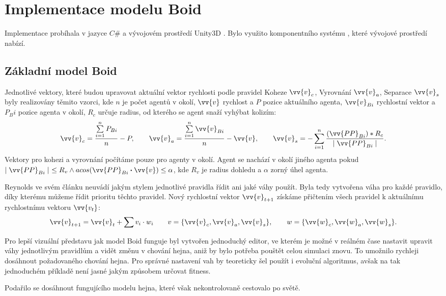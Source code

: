 \section{Implementace modelu Boid}
Implementace probíhala v jazyce $C\#$ a vývojovém prostředí Unity3D \cite{Unity}. Bylo využito komponentního systému \cite{Components}, které vývojové prostředí nabízí. 
\subsection{Základní model Boid}
Jednotlivé vektory, které budou upravovat aktuální vektor rychlosti podle pravidel Koheze $\vv{v}_c$, Vyrovnání $\vv{v}_a$, Separace $\vv{v}_s$ byly realizovány těmito vzorci, kde $n$ je počet agentů v okolí, $\vv{v}$ rychlost a $P$ pozice aktuálního agenta, $\vv{v}_{Bi}$ rychlostní vektor a $P_Bi$ pozice agenta v okolí, $R_c$ určuje radius, od kterého se agent snaží vyhýbat kolizím: 
\begin{equation*}
\vv{v}_c = \frac{ \sum\limits_{i=1}^n{P_{Bi} } }{ n } - P, \qquad
\vv{v}_a = \frac{ \sum\limits_{i=1}^n{\vv{v}_{Bi} } }{ n } - \vv{v}, \qquad
\vv{v}_s = -\sum\limits_{i=1}^n{ \frac{(\vv{PP}_{Bi}) * R_c}{\mid \vv{PP}_{Bi}\mid}}.
\end{equation*}
Vektory pro kohezi a vyrovnání počítáme pouze pro agenty v okolí. Agent se nachází v okolí jiného agenta pokud $\mid\vv{PP}_{Bi}\mid \ \leq R_v \land acos(\vv{PP}_{Bi} \boldsymbol{\cdot} \vv{v}) \leq \alpha $, kde $R_v$ je radius dohledu a $\alpha$ zorný úhel agenta. 
\par
Reynolds ve svém článku neuvádí jakým stylem jednotlivé pravidla řídit ani jaké váhy použít. Byla tedy vytvořena váha pro každé pravidlo, díky kterému můžeme řídit prioritu těchto pravidel. Nový rychlostní vektor $\vv{v}_{t+1}$ získáme přičtením všech pravidel k aktuálnímu rychlostnímu vektoru $\vv{v_t}$: 
\begin{equation*}
\vv{v}_{t+1} = \vv{v}_t + \sum{v_i \cdot w_i} \qquad v = \{\vv{v}_c, \vv{v}_a, \vv{v}_s\}, \qquad w = \{\vv{w}_c, \vv{w}_a, \vv{w}_s\}. 
\end{equation*}
\par
Pro lepší vizuální představu jak model Boid funguje byl vytvořen jednoduchý editor, ve kterém je možné v reálném čase nastavit upravit váhy jednotlivým pravidlům a vidět změnu v chování hejna, aniž by bylo potřeba pouštět celou simulaci znovu. To umožnilo rychleji dosáhnout požadovaného chování hejna. Pro správné nastavení vah by teoreticky šel použít i evoluční algoritmus, avšak na tak jednoduchém příkladě není jasné jakým způsobem určovat fitness. 
\par
Podařilo se dosáhnout fungujícího modelu hejna, které však nekontrolovaně cestovalo po světě. 

